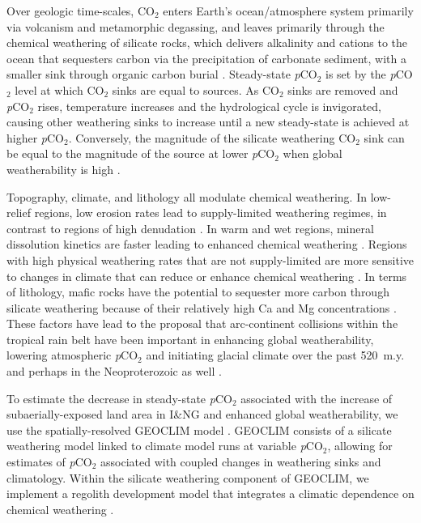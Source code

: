 \documentclass[11pt,letterpaper]{article}
\newcommand{\pCOtwo}{\textit{p}CO$_{2}$\xspace}
\newcommand{\COtwo}{CO$_{2}$\xspace}
\begin{document}
Over geologic time-scales, \COtwo enters Earth's ocean/atmosphere system primarily via volcanism and metamorphic degassing, and leaves primarily through the chemical weathering of silicate rocks, which delivers alkalinity and cations to the ocean that sequesters carbon via the precipitation of carbonate sediment, with a smaller sink through organic carbon burial \cite{Kump2000a}. Steady-state \pCOtwo is set by the \pCOtwo level at which \COtwo sinks are equal to sources. As \COtwo sinks are removed and \pCOtwo rises, temperature increases and the hydrological cycle is invigorated, causing other weathering sinks to increase until a new steady-state is achieved at higher \pCOtwo. Conversely, the magnitude of the silicate weathering \COtwo sink can be equal to the magnitude of the source at lower \pCOtwo when global weatherability is high \cite{Kump1997a}.

Topography, climate, and lithology all modulate chemical weathering. In low-relief regions, low erosion rates lead to supply-limited weathering regimes, in contrast to regions of high denudation \cite{Gabet2009a, West2012a, Maher2014a}. In warm and wet regions, mineral dissolution kinetics are faster leading to enhanced chemical weathering \cite{Lasaga1994a, West2012a}. Regions with high physical weathering rates that are not supply-limited are more sensitive to changes in climate that can reduce or enhance chemical weathering \cite{West2012a, Maher2014a}. In terms of lithology, mafic rocks have the potential to sequester more carbon through silicate weathering because of their relatively high Ca and Mg concentrations \cite{Dessert2003a}. These factors have lead to the proposal that arc-continent collisions within the tropical rain belt have been important in enhancing global weatherability, lowering atmospheric \pCOtwo and initiating glacial climate over the past 520~m.y. \cite{Jagoutz2016a, Swanson-Hysell2017a, Macdonald2019a} and perhaps in the Neoproterozoic as well \cite{Park2019a}.

To estimate the decrease in steady-state \pCOtwo associated with the increase of subaerially-exposed land area in I\&NG and enhanced global weatherability, we use the spatially-resolved GEOCLIM model \cite{Godderis2014a, Godderis2017c}. GEOCLIM consists of a silicate weathering model linked to climate model runs at variable \pCOtwo, allowing for estimates of \pCOtwo associated with coupled changes in weathering sinks and climatology. Within the silicate weathering component of GEOCLIM, we implement a regolith development model \cite{Gabet2009a} that integrates a climatic dependence on chemical weathering \cite{West2012a}.
\end{document}

